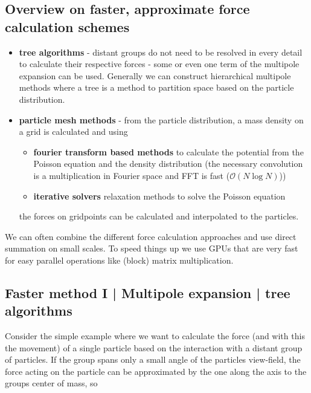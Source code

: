 \subsection{Overview on faster, approximate force calculation schemes}
\begin{itemize}
    \item \textbf{tree algorithms} - distant groups do not need to be resolved in every detail to calculate their respective forces - some or even one term of the multipole expansion can be used. Generally we can construct hierarchical multipole methods where a tree is a method to partition space based on the particle distribution.
    \item \textbf{particle mesh methods} - from the particle distribution, a mass density on a grid is calculated and using
    \begin{itemize}
        \item \textbf{fourier transform based methods} to calculate the potential from the Poisson equation and the density distribution (the necessary convolution is a multiplication in Fourier space and FFT is fast ($\mathcal{O}(N \log N)$))
        \item \textbf{iterative solvers} relaxation methods to solve the Poisson equation
    \end{itemize}
    the forces on gridpoints can be calculated and interpolated to the particles.
\end{itemize}

We can often combine the different force calculation approaches and use direct 
summation on small scales. To speed things up we use GPUs that are very fast for 
easy parallel operations like (block) matrix multiplication.

\subsection{Faster method I | Multipole expansion | tree algorithms}

Consider the simple example where we want to calculate the force (and with this the
movement) of a single particle based on the interaction with a distant group of particles.
If the group spans only a small angle of the particles view-field, the force acting
on the particle can be approximated by the one along the axis to the groups center of mass, so

